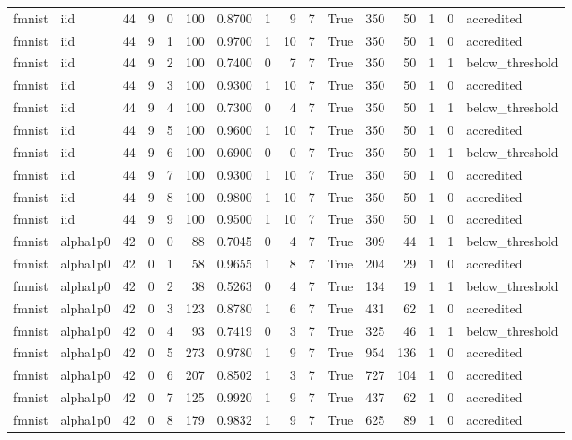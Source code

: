 \begin{tabular}{llrrrrrrrrrrrrrl}
fmnist & iid & 44 & 9 & 0 & 100 & 0.8700 & 1 & 9 & 7 & True & 350 & 50 & 1 & 0 & accredited \\
fmnist & iid & 44 & 9 & 1 & 100 & 0.9700 & 1 & 10 & 7 & True & 350 & 50 & 1 & 0 & accredited \\
fmnist & iid & 44 & 9 & 2 & 100 & 0.7400 & 0 & 7 & 7 & True & 350 & 50 & 1 & 1 & below\_threshold \\
fmnist & iid & 44 & 9 & 3 & 100 & 0.9300 & 1 & 10 & 7 & True & 350 & 50 & 1 & 0 & accredited \\
fmnist & iid & 44 & 9 & 4 & 100 & 0.7300 & 0 & 4 & 7 & True & 350 & 50 & 1 & 1 & below\_threshold \\
fmnist & iid & 44 & 9 & 5 & 100 & 0.9600 & 1 & 10 & 7 & True & 350 & 50 & 1 & 0 & accredited \\
fmnist & iid & 44 & 9 & 6 & 100 & 0.6900 & 0 & 0 & 7 & True & 350 & 50 & 1 & 1 & below\_threshold \\
fmnist & iid & 44 & 9 & 7 & 100 & 0.9300 & 1 & 10 & 7 & True & 350 & 50 & 1 & 0 & accredited \\
fmnist & iid & 44 & 9 & 8 & 100 & 0.9800 & 1 & 10 & 7 & True & 350 & 50 & 1 & 0 & accredited \\
fmnist & iid & 44 & 9 & 9 & 100 & 0.9500 & 1 & 10 & 7 & True & 350 & 50 & 1 & 0 & accredited \\
fmnist & alpha1p0 & 42 & 0 & 0 & 88 & 0.7045 & 0 & 4 & 7 & True & 309 & 44 & 1 & 1 & below\_threshold \\
fmnist & alpha1p0 & 42 & 0 & 1 & 58 & 0.9655 & 1 & 8 & 7 & True & 204 & 29 & 1 & 0 & accredited \\
fmnist & alpha1p0 & 42 & 0 & 2 & 38 & 0.5263 & 0 & 4 & 7 & True & 134 & 19 & 1 & 1 & below\_threshold \\
fmnist & alpha1p0 & 42 & 0 & 3 & 123 & 0.8780 & 1 & 6 & 7 & True & 431 & 62 & 1 & 0 & accredited \\
fmnist & alpha1p0 & 42 & 0 & 4 & 93 & 0.7419 & 0 & 3 & 7 & True & 325 & 46 & 1 & 1 & below\_threshold \\
fmnist & alpha1p0 & 42 & 0 & 5 & 273 & 0.9780 & 1 & 9 & 7 & True & 954 & 136 & 1 & 0 & accredited \\
fmnist & alpha1p0 & 42 & 0 & 6 & 207 & 0.8502 & 1 & 3 & 7 & True & 727 & 104 & 1 & 0 & accredited \\
fmnist & alpha1p0 & 42 & 0 & 7 & 125 & 0.9920 & 1 & 9 & 7 & True & 437 & 62 & 1 & 0 & accredited \\
fmnist & alpha1p0 & 42 & 0 & 8 & 179 & 0.9832 & 1 & 9 & 7 & True & 625 & 89 & 1 & 0 & accredited \\

\end{tabular}
